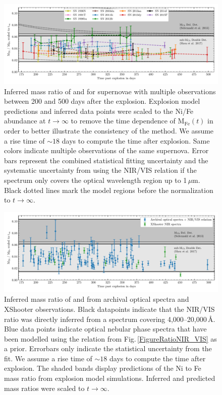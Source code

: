 \documentclass[fleqn,usenatbib]{mnras}
\begin{document}
\begin{figure}
	\includegraphics[width=\linewidth]{plots/NiFe_singly_multiplespectra.pdf}
    \caption{Inferred mass ratio of  and  for supernovae with multiple observations between 200 and 500 days after the explosion. Explosion model predictions and inferred data points were scaled to the Ni/Fe abundance at $t\rightarrow\infty$ to remove the time dependence of M$_{\text{Fe}}(t)$ in order to better illustrate the consistency of the method. We assume a rise time of $\sim 18$ days \citep{2011MNRAS.416.2607G} to compute the time after explosion. Same colors indicate multiple observations of the same supernova. Error bars represent the combined statistical fitting uncertainty and the systematic uncertainty from using the NIR/VIS relation if the spectrum only covers the optical wavelength region up to 1$\,\mu$m. Black dotted lines mark the model regions before the normalization to $t\rightarrow\infty$.}
    \label{NiOverFe_test_timesequences}
\end{figure}
\begin{figure}
	\includegraphics[width=\linewidth]{plots/NiFe_all_SNe.pdf}
    \caption{Inferred mass ratio of  and  from archival optical spectra and XShooter observations. Black datapoints indicate that the  NIR/VIS ratio was directly inferred from a spectrum covering 4,000--20,000\,\AA. Blue data points indicate optical nebular phase spectra that have been modelled using the relation from Fig.\,\ref{FigureRatioNIR_VIS} as a prior. Errorbars only indicate the statistical uncertainty from the fit. We assume a rise time of $\sim 18$ days \citep{2011MNRAS.416.2607G} to compute the time after explosion. The shaded bands display predictions of the Ni to Fe mass ratio from explosion model simulations. Inferred and predicted mass ratios were scaled to $t\rightarrow\infty$.}
    \label{NiOverFe_all}
\end{figure}
\end{document}
